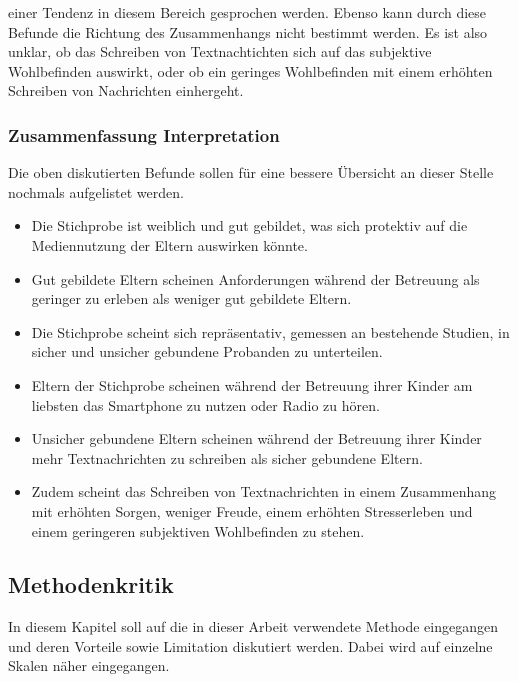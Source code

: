 einer Tendenz in diesem Bereich gesprochen werden. Ebenso kann durch diese Befunde die Richtung des Zusammenhangs nicht bestimmt werden. Es ist also unklar, ob das Schreiben von Textnachtichten sich auf das subjektive Wohlbefinden auswirkt, oder ob ein geringes Wohlbefinden mit einem erhöhten Schreiben von Nachrichten einhergeht.  


\subsubsection{Zusammenfassung Interpretation}
Die oben diskutierten Befunde sollen für eine bessere Übersicht an dieser Stelle nochmals aufgelistet werden.
\begin{itemize}
    \item Die Stichprobe ist weiblich und gut gebildet, was sich protektiv auf die Mediennutzung der Eltern auswirken könnte.
    
    \item Gut gebildete Eltern scheinen Anforderungen während der Betreuung als geringer zu erleben als weniger gut gebildete Eltern.
    
    \item Die Stichprobe scheint sich repräsentativ, gemessen an bestehende Studien, in sicher und unsicher gebundene Probanden zu unterteilen.
    
    \item Eltern der Stichprobe scheinen während der Betreuung ihrer Kinder am liebsten das Smartphone zu nutzen oder Radio zu hören.
    
    \item Unsicher gebundene Eltern scheinen während der Betreuung ihrer Kinder mehr Textnachrichten zu schreiben als sicher gebundene Eltern. 
    
    \item Zudem scheint das Schreiben von Textnachrichten in einem Zusammenhang mit erhöhten Sorgen, weniger Freude, einem erhöhten Stresserleben und einem geringeren subjektiven Wohlbefinden zu stehen. 
\end{itemize}


\subsection{Methodenkritik} \label{sec:Methodenkritik}
In diesem Kapitel soll auf die in dieser Arbeit verwendete Methode eingegangen  und deren Vorteile sowie Limitation diskutiert werden. Dabei wird auf einzelne Skalen näher eingegangen.

